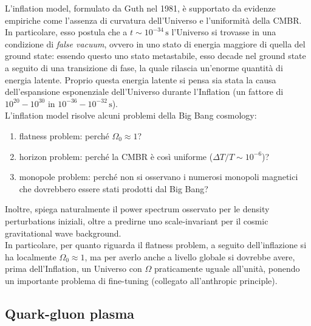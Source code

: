 L'inflation model, formulato da Guth nel 1981, è supportato da evidenze empiriche come l'assenza di curvatura dell'Universo e l'uniformità della CMBR. In particolare, esso postula che a $ t \sim 10^{-34} \,\text{s} $ l'Universo si trovasse in una condizione di \textit{false vacuum}, ovvero in uno stato di energia maggiore di quella del ground state: essendo questo uno stato metastabile, esso decade nel ground state a seguito di una transizione di fase, la quale rilascia un'enorme quantità di energia latente. Proprio questa energia latente si pensa sia stata la causa dell'espansione esponenziale dell'Universo durante l'Inflation (un fattore di $ 10^{20} - 10^{30} $ in $ 10^{-36} - 10^{-32} \,\text{s} $).\\
L'inflation model risolve alcuni problemi della Big Bang cosmology:
\begin{enumerate}
	\item flatness problem: perché $ \Omega_0 \approx 1 $?
	\item horizon problem: perché la CMBR è così uniforme ($ \Delta T / T \sim 10^{-6} $)?
	\item monopole problem: perché non si osservano i numerosi monopoli magnetici che dovrebbero essere stati prodotti dal Big Bang?
\end{enumerate}
Inoltre, spiega naturalmente il power spectrum osservato per le density perturbations iniziali, oltre a predirne uno scale-invariant per il cosmic gravitational wave background.\\
In particolare, per quanto riguarda il flatness problem, a seguito dell'inflazione si ha localmente $ \Omega_0 \approx 1 $, ma per averlo anche a livello globale si dovrebbe avere, prima dell'Inflation, un Universo con $ \Omega $ praticamente uguale all'unità, ponendo un importante problema di fine-tuning (collegato all'anthropic principle).

\subsection{Quark-gluon plasma}

